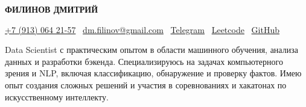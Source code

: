 
\begin{center}
  {\huge\rmfamily\bfseries ФИЛИНОВ ДМИТРИЙ}
\end{center}
\begin{center}
\href{tel:+79130642157}{+7 (913) 064 21-57} \textbar\ 
\href{mailto:dm.filinov@gmail.com}{dm.filinov@gmail.com} \textbar\
  \href{https://t.me/D1ffic00lt}{Telegram} \textbar\ 
  \href{https://leetcode.com/u/D1ffic00lt/}{Leetcode} \textbar\ 
  \href{https://github.com/D1ffic00lt}{GitHub}
\end{center}
Data Scientist с практическим опытом в области машинного обучения, анализа данных и разработки бэкенда. Специализируюсь на задачах компьютерного зрения и NLP, включая классификацию, обнаружение и проверку фактов. Имею опыт создания сложных решений и участия в соревнованиях и хакатонах по искусственному интеллекту.